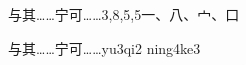 \begin{entry}{与其……宁可……}{3,8,5,5}{⼀、⼋、⼧、⼝}
  \begin{phonetics}{与其……宁可……}{yu3qi2 ning4ke3}
  \end{phonetics}
\end{entry}

